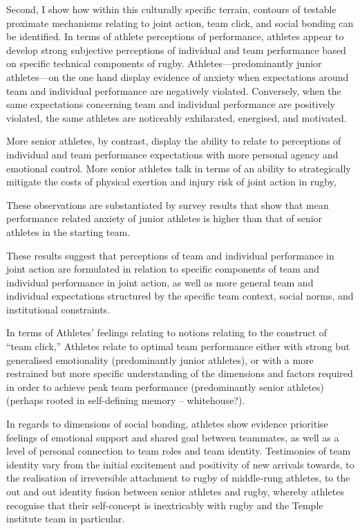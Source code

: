 Second, I show how within this culturally specific terrain, contours of testable proximate mechanisms relating to joint action, team click, and social bonding can be identified.   In terms of athlete perceptions of performance, athletes appear to develop strong subjective perceptions of individual and team performance based on specific technical components of rugby.   Athletes---predominantly junior athletes---on the one hand display evidence of anxiety when expectations around team and individual performance are negatively violated.  Conversely, when the same expectations concerning team and individual performance are positively violated, the same athletes are noticeably exhilarated, energised, and motivated.

More senior athletes, by contrast, display the ability to relate to perceptions of individual and team performance expectations with more personal agency and emotional control.  More senior athletes talk in terms of an ability to strategically mitigate the costs of physical exertion and injury risk of joint action in rugby,

These observations are substantiated by survey results that show that mean performance related anxiety of junior athletes is higher than that of senior athletes in the starting team.

These results suggest that perceptions of team and individual performance in joint action are formulated in relation to specific components of team and individual performance in joint action, as well as more general team and individual expectations structured by the specific team context, social norms, and institutional constraints.

In terms of Athletes' feelings relating to notions relating to the construct of ``team click,'' Athletes relate to optimal team performance either with strong but generalised emotionality (predominantly junior athletes), or with a more restrained but more specific understanding of the dimensions and factors required in order to achieve peak team performance (predominantly senior athletes) (perhaps rooted in self-defining memory -- whitehouse?).

In regards to dimensions of social bonding, athletes show evidence prioritise feelings of emotional support and shared goal between teammates, as well as a level of personal connection to team roles and team identity.  Testimonies of team identity vary from the initial excitement and positivity of new arrivals towards, to the realisation of irreversible attachment to rugby of middle-rung athletes, to the out and out identity fusion between senior athletes and rugby, whereby athletes recognise that their self-concept is inextricably with rugby and the Temple institute team in particular.


